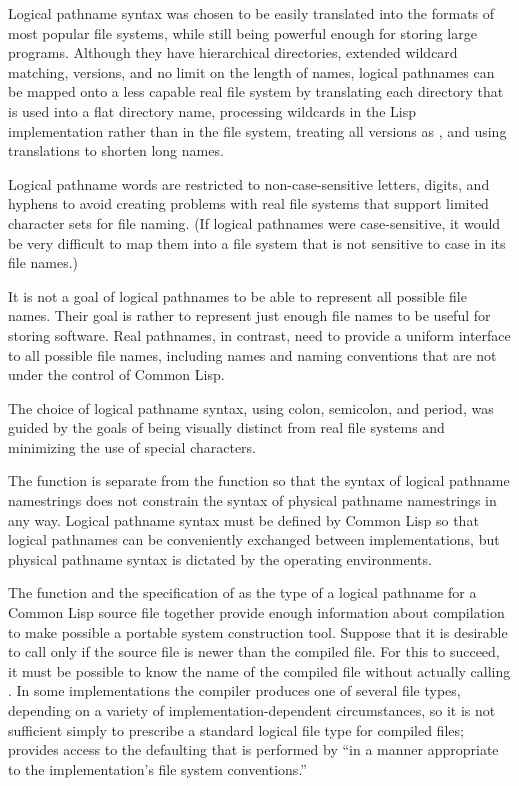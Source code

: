    Logical pathname syntax was chosen to be easily translated into the formats of most
  popular file systems, while still being powerful enough for storing large
  programs.  Although they have hierarchical directories, extended wildcard
  matching, versions, and no limit on the length of names, logical pathnames can be
  mapped onto a less capable real file system by translating each
  directory that is used into a flat directory name, processing wildcards in
  the Lisp implementation rather than in the file system, treating all versions as ,
  and using translations to shorten long names.

  Logical pathname words are restricted to non-case-sensitive letters,
  digits, and hyphens to avoid creating problems with real file systems
  that support limited character sets for file naming.
  (If logical pathnames were
  case-sensitive, it would be very difficult to map them into a
  file system that is not sensitive to case in its file names.)

  It is not a goal of logical pathnames to be able to represent all
  possible file names.  Their goal is rather to represent just enough file
  names to be useful for storing software.  Real pathnames, in contrast,
  need to provide a uniform interface to all possible file names, including
  names and naming conventions that are not under the control of Common
  Lisp.

  The choice of logical pathname syntax, using colon, semicolon, and
  period, was guided by the goals of being visually distinct from real file
  systems and minimizing the use of special characters.

  The  function is separate from the  function
  so that the syntax of logical pathname namestrings does not constrain the
  syntax of physical pathname namestrings in any way.  Logical pathname
  syntax must be defined by Common Lisp so that logical pathnames can be
  conveniently exchanged between implementations, but physical pathname
  syntax is dictated by the operating environments.


  The  function and the specification of 
  as the type of a logical pathname for a Common Lisp source file together
  provide enough information about compilation to make possible a portable system
  construction tool.  Suppose that it is desirable
  to call  only if the source file is newer than the compiled
  file.  For this to succeed, it must be possible to know the name of the
  compiled file without actually calling .
  In some implementations the compiler produces one of several file types,
  depending on a variety of implementation-dependent circumstances,
  so it is not sufficient simply to prescribe a standard logical file type
  for compiled files;
   provides access to the defaulting that is performed
  by  ``in a manner
  appropriate to the implementation's file system conventions.''

